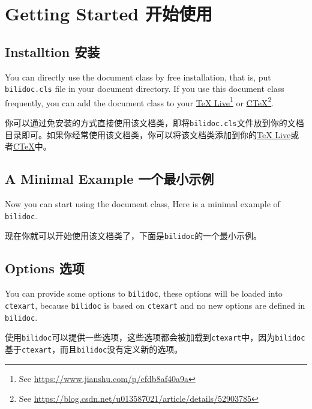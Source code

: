 \section{Getting Started 开始使用}

\subsection{Installtion 安装}

\begin{ParaColumn}

    You can directly use the document class by free installation, that is, put \verb"bilidoc.cls" file in your document directory.  If you use this document class frequently, you can add the document class to your \href{http://tug.org/texlive/}{\TeX{} Live}\footnote{See \url{https://www.jianshu.com/p/cfdb8af40a9a}} or \href{http://www.ctex.org/}{C\TeX{}}\footnote{See \url{https://blog.csdn.net/u013587021/article/details/52903785}}.

    \switchcolumn

    你可以通过免安装的方式直接使用该文档类，即将\verb"bilidoc.cls"文件放到你的文档目录即可。如果你经常使用该文档类，你可以将该文档类添加到你的\href{http://tug.org/texlive/}{\TeX{} Live}或者\href{http://www.ctex.org/}{C\TeX{}}中。

\end{ParaColumn}

\subsection{A Minimal Example 一个最小示例}

\begin{ParaColumn}

    Now you can start using the document class, Here is a minimal example of \verb"bilidoc".

    \switchcolumn

    现在你就可以开始使用该文档类了，下面是\verb"bilidoc"的一个最小示例。

\end{ParaColumn}



\subsection{Options 选项}

\begin{ParaColumn}

    You  can provide some options to \verb"bilidoc", these options will be loaded into \verb"ctexart", because \verb"bilidoc" is based on \verb"ctexart" and no new options are defined in \verb"bilidoc".

    \switchcolumn

    使用\verb"bilidoc"可以提供一些选项，这些选项都会被加载到\verb"ctexart"中，因为\verb"bilidoc"基于\verb"ctexart"，而且\verb"bilidoc"没有定义新的选项。

\end{ParaColumn}
